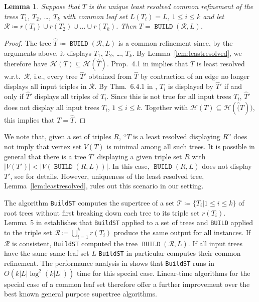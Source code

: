 \documentclass[11pt]{article}
\newtheorem{lemma}[theorem]{Lemma}
\newcommand{\HH}{\mathcal{H}}
\DeclareMathOperator{\build}{\mathtt{BUILD}}
\begin{document}
\begin{lemma}
  \label{lem:Aho}
  Suppose that $T$ is the unique least resolved common refinement of the
  trees $T_1$, $T_2$, \dots, $T_k$ with common leaf set $L(T_i)=L$,
  $1\le i\le k$ and let $\mathcal{R}\coloneqq r(T_i)\cup r(T_2)\cup \dots
  \cup r(T_k)$. Then $T=\build(\mathcal{R},L)$.
\end{lemma}
\begin{proof}
  The tree $\widehat{T}\coloneqq \build(\mathcal{R},L)$ is a common
  refinement since, by the arguments above, it displays $T_1$, $T_2$,
  \dots, $T_k$. By Lemma~\ref{lem:leastresolved}, we therefore have
  $\HH(T)\subseteq\HH(\widehat{T})$.  Prop.~4.1 in \cite{Semple:03a}
  implies that $\widehat{T}$ is least resolved w.r.t.\ $\mathcal{R}$, i.e.,
  every tree $\widehat{T}'$ obtained from $\widehat{T}$ by contraction of
  an edge no longer displays all input triples in $\mathcal{R}$.  By
  Thm.~6.4.1 in \cite{Semple:03}, $T_i$ is displayed by $\widehat{T}'$ if
  and only if $\widehat{T}'$ displays all triples of $T_i$. Since this is
  not true for all input trees $T_i$, $\widehat{T}'$ does not display all
  input trees $T_i$, $1\le i\le k$.  Together with
  $\HH(T)\subseteq\HH(\widehat(T))$, this implies that $T=\widehat{T}$.
\end{proof} 

We note that, given a set of triples $R$, ``$T$ is a least resolved
displaying $R$'' does not imply that vertex set $V(T)$ is minimal among all
such trees.  It is possible in general that there is a tree $T'$ displaying
a given triple set $R$ with $|V(T')|<|V(\build(R, L))|$.  In this case,
$\build(R,L)$ does not display $T'$, see \cite{Jansson:12} for
details. However, uniqueness of the least resolved tree,
Lemma~\ref{lem:leastresolved}, rules out this scenario in our setting.


The algorithm \texttt{BuildST} \cite{Deng:18} computes the supertree of a
set $\mathcal{T}\coloneqq \{T_i| 1\le i\le k\}$ of root trees without first
breaking down each tree to its triple set $r(T_i)$. Lemma~5 in
\cite{Deng:18} establishes that \texttt{BuildST} applied to a set of trees
and \texttt{BUILD} applied to the triple set
$\mathcal{R}\coloneqq\bigcup_{i=1}^k r(T_i)$ produce the same output for
all instances. If $\mathcal{R}$ is consistent, \texttt{BuildST} computed
the tree $\build(\mathcal{R},L)$. If all input trees have the same same
leaf set $L$ \texttt{BuildST} in particular computes their common
refinement. The performance analysis in \cite{Deng:18} shows that
\texttt{BuildST} runs in $O(k|L| \log^2(k|L|))$ time for this special case.
Linear-time algorithms for the special case of a common leaf set
therefore offer a further improvement over the best known general purpose
supertree algorithms.
\end{document}
